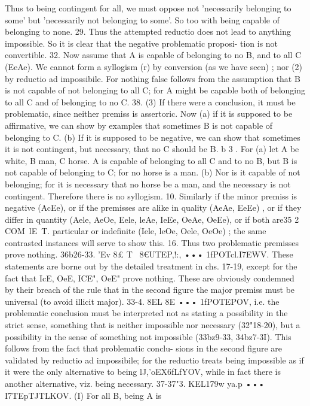 {{{{{{{{Thus to being contingent for all, we must oppose not 'necessarily
belonging to some' but 'necessarily not belonging to some'. So
too with being capable of belonging to none.
29. Thus the attempted reductio does not lead to anything
impossible. So it is clear that the negative problematic proposi-
tion is not convertible.
32. Now assume that A is capable of belonging to no B, and to
all C (EeAe). We cannot form a syllogism (r) by conversion (as we
have seen) ; nor (2) by reductio ad impossibile. For nothing false
follows from the assumption that B is not capable of not belonging
to all C; for A might be capable both of belonging to all C and of
belonging to no C.
38. (3) If there were a conclusion, it must be problematic, since
neither premiss is assertoric. Now (a) if it is supposed to be
affirmative, we can show by examples that sometimes B is not
capable of belonging to C. (b) If it is supposed to be negative, we
can show that sometimes it is not contingent, but necessary, that
no C should be B.
b 3 . For (a) let A be white, B man, C horse. A is capable of
belonging to all C and to no B, but B is not capable of belonging
to C; for no horse is a man. (b) Nor is it capable of not belonging;
for it is necessary that no horse be a man, and the necessary is not
contingent. Therefore there is no syllogism.
10. Similarly if the minor premiss is negative (AcEe), or if the
premisses are alike in quality (AeAe, EeEe) , or if they differ in
quantity (Aele, AeOe, Eele, leAe, IeEe, OeAe, OeEe), or if both are35 2
COM~lE~T.\RY
particular or indefinite (Iele, leOe, Oele, OeOe) ; the same contrasted
instances will serve to show this.
16. Thus two problematic premisses prove nothing.
36b26-33. 'Ev 8£ T~ 8€UTEP,!:, ••• 1fPOTcl.I7EWV. These statements
are borne out by the detailed treatment in chs. 17-19, except
for the fact that IcE, OeE, ICE", OeE" prove nothing. These
are obviously condemned by their breach of the rule that in the
second figure the major premiss must be universal (to avoid
illicit major).
33-4. 8EL 8E ••• 1fPOTEPOV, i.e. the problematic conclusion
must be interpreted not as stating a possibility in the strict sense,
something that is neither impossible nor necessary (32"18-20), but
a possibility in the sense of something not impossible (33bz9-33,
34bz7-3I). This follows from the fact that problematic conclu-
sions in the second figure are validated by reductio ad impossibile;
for the reductio treats being impossible as if it were the only
alternative to being lJ,'oEX6fLfYOV, while in fact there is another
alternative, viz. being necessary.
37-37"3. KEL179w ya.p ••• I7TEpTJTLKOV. (I) For all B, being A is
}}}}}}}}
